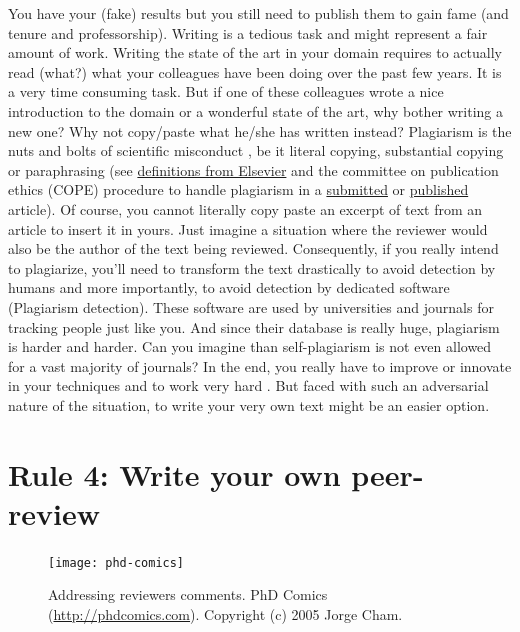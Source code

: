 \documentclass[a4paper,10pt,onecolumn]{article}
\begin{document}
You have your (fake) results but you still need to publish them to gain fame
(and tenure and professorship). Writing is a tedious task and might represent a
fair amount of work. Writing the state of the art in your domain requires to
actually read (what?) what your colleagues have been doing over the past few
years. It is a very time consuming task. But if one of these colleagues wrote a
nice introduction to the domain or a wonderful state of the art, why bother
writing a new one? Why not copy/paste what he/she has written instead?
Plagiarism is the nuts and bolts of scientific misconduct
\citep{neuroskeptic:2017}, be it literal copying, substantial copying or
paraphrasing (see
\href{https://www.elsevier.com/editors/perk/plagiarism-complaints}{definitions
  from Elsevier} and the committee on publication ethics (COPE) procedure to
handle plagiarism in a
\href{https://www.elsevier.com/__data/assets/pdf_file/0005/72815/plagiarism-A.pdf}{submitted}
or
\href{https://www.elsevier.com/__data/assets/pdf_file/0020/72830/plagiarism-B_0.pdf}{published}
article). Of course, you cannot literally copy paste an excerpt of text from an
article to insert it in yours. Just imagine a situation where the reviewer
would also be the author of the text being reviewed. Consequently, if you
really intend to plagiarize, you'll need to transform the text drastically to
avoid detection by humans \citep{dorigo:2015,} and more importantly, to avoid
detection by dedicated software (Plagiarism detection). These software are used
by universities and journals for tracking people just like you. And since their
database is really huge, plagiarism is harder and harder. Can you imagine than
self-plagiarism is not even allowed for a vast majority of journals? In the
end, you really have to improve or innovate in your techniques and to work very
hard \citep{long:2009}. But faced with such an adversarial nature of the
situation, to write your very own text might be an easier option.


\section*{Rule 4: Write your own peer-review}

\begin{figure}
  \vspace{-5mm}
  \begin{center}
    \texttt{[image: phd-comics]}
  \end{center}
  \caption{Addressing reviewers comments. PhD Comics
    (\url{http://phdcomics.com}). Copyright (c) 2005 Jorge Cham.}
\end{figure}
\end{document}
